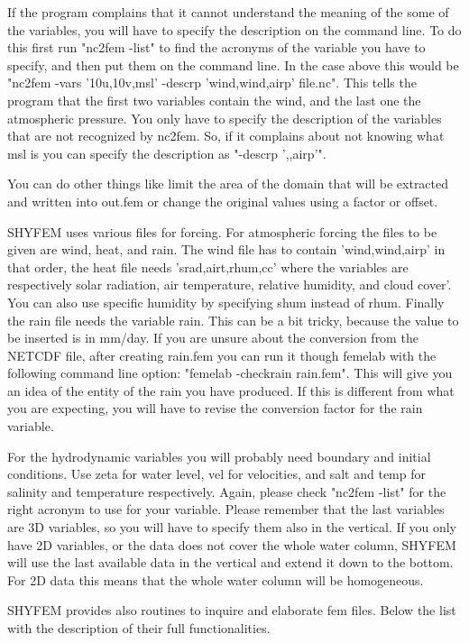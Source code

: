 If the program complains that it cannot understand the meaning of the
some of the variables, you will have to specify the description on the
command line.  To do this first run "nc2fem -list" to find the acronyms
of the variable you have to specify, and then put them on the command
line. In the case above this would be "nc2fem -vars '10u,10v,msl' -descrp
'wind,wind,airp' file.nc". This tells the program that the first two
variables contain the wind, and the last one the atmospheric pressure.
You only have to specify the description of the variables that are not
recognized by nc2fem. So, if it complains about not knowing what msl is
you can specify the description as "-descrp ',,airp'".

You can do other things like limit the area of the domain that will be
extracted and written into out.fem or change the original values using
a factor or offset.

SHYFEM uses various files for forcing. For atmospheric forcing the
files to be given are wind, heat, and rain. The wind file has to contain
'wind,wind,airp' in that order, the heat file needs 'srad,airt,rhum,cc'
where the variables are respectively solar radiation, air temperature,
relative humidity, and cloud cover'. You can also use specific humidity by
specifying shum instead of rhum. Finally the rain file needs the variable
rain. This can be a bit tricky, because the value to be inserted is in
mm/day. If you are unsure about the conversion from the NETCDF file,
after creating rain.fem you can run it though femelab with the following
command line option: "femelab -checkrain rain.fem". This will give you an
idea of the entity of the rain you have produced. If this is different
from what you are expecting, you will have to revise the conversion
factor for the rain variable.

For the hydrodynamic variables you will probably need boundary and
initial conditions. Use zeta for water level, vel for velocities, and
salt and temp for salinity and temperature respectively. Again, please
check "nc2fem -list" for the right acronym to use for your variable.
Please remember that the last variables are 3D variables, so you will
have to specify them also in the vertical. If you only have 2D variables,
or the data does not cover the whole water column, SHYFEM will use the
last available data in the vertical and extend it down to the bottom. For
2D data this means that the whole water column will be homogeneous.



SHYFEM provides also routines to inquire and elaborate fem files. Below the list with the description of their full
functionalities.
